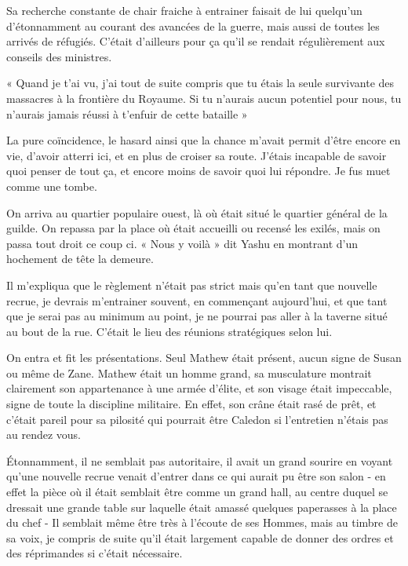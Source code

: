 \documentclass{book}
\begin{document}
Sa recherche constante de chair fraiche à entrainer faisait de lui quelqu'un d'étonnamment au courant des avancées de la guerre, mais aussi de toutes les arrivés de réfugiés. C'était d'ailleurs pour ça qu'il se rendait régulièrement aux conseils des ministres.\newline

« Quand je t'ai vu, j'ai tout de suite compris que tu étais la seule survivante des massacres à la frontière du Royaume. Si tu n'aurais aucun potentiel pour nous, tu n'aurais jamais réussi à t'enfuir de cette bataille »\newline

La pure coïncidence, le hasard ainsi que la chance m'avait permit d'être encore en vie, d'avoir atterri ici, et en plus de croiser sa route. J'étais incapable de savoir quoi penser de tout ça, et encore moins de savoir quoi lui répondre. Je fus muet comme une tombe.\newline

On arriva au quartier populaire ouest, là où était situé le quartier général de la guilde. On repassa par la place où était accueilli ou recensé les exilés, mais on passa tout droit ce coup ci. « Nous y voilà » dit Yashu en montrant d'un hochement de tête la demeure.\newline

Il m'expliqua que le règlement n'était pas strict mais qu'en tant que nouvelle recrue, je devrais m'entrainer souvent, en commençant aujourd'hui, et que tant que je serai pas au minimum au point, je ne pourrai pas aller à la taverne situé au bout de la rue. C'était le lieu des réunions stratégiques selon lui.\newline

On entra et fit les présentations. Seul Mathew était présent, aucun signe de Susan ou même de Zane. Mathew était un homme grand, sa musculature montrait clairement son appartenance à une armée d'élite, et son visage était impeccable, signe de toute la discipline militaire. En effet, son crâne était rasé de prêt, et c'était pareil pour sa pilosité qui pourrait être Caledon si l'entretien n'étais pas au rendez vous.\newline

Étonnamment, il ne semblait pas autoritaire, il avait un grand sourire en voyant qu'une nouvelle recrue venait d'entrer dans ce qui aurait pu être son salon - en effet la pièce où il était semblait être comme un grand hall, au centre duquel se dressait une grande table sur laquelle était amassé quelques paperasses à la place du chef - Il semblait même être très à l'écoute de ses Hommes, mais au timbre de sa voix, je compris de suite qu'il était largement capable de donner des ordres et des réprimandes si c'était nécessaire.\newline
\end{document}
